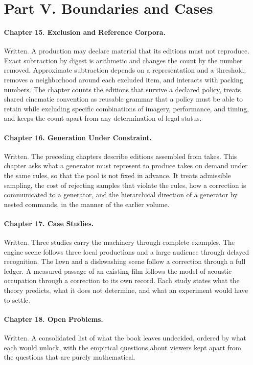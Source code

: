 \documentclass[11pt]{article}
\begin{document}
\section*{Part V. Boundaries and Cases}

\paragraph{Chapter 15. Exclusion and Reference Corpora.} Written. A production may declare material that its editions must not reproduce. Exact subtraction by digest is arithmetic and changes the count by the number removed. Approximate subtraction depends on a representation and a threshold, removes a neighborhood around each excluded item, and interacts with packing numbers. The chapter counts the editions that survive a declared policy, treats shared cinematic convention as reusable grammar that a policy must be able to retain while excluding specific combinations of imagery, performance, and timing, and keeps the count apart from any determination of legal status.

\paragraph{Chapter 16. Generation Under Constraint.} Written. The preceding chapters describe editions assembled from takes. This chapter asks what a generator must represent to produce takes on demand under the same rules, so that the pool is not fixed in advance. It treats admissible sampling, the cost of rejecting samples that violate the rules, how a correction is communicated to a generator, and the hierarchical direction of a generator by nested commands, in the manner of the earlier volume.

\paragraph{Chapter 17. Case Studies.} Written. Three studies carry the machinery through complete examples. The engine scene follows three local productions and a large audience through delayed recognition. The lawn and a dishwashing scene follow a correction through a full ledger. A measured passage of an existing film follows the model of acoustic occupation through a correction to its own record. Each study states what the theory predicts, what it does not determine, and what an experiment would have to settle.

\paragraph{Chapter 18. Open Problems.} Written. A consolidated list of what the book leaves undecided, ordered by what each would unlock, with the empirical questions about viewers kept apart from the questions that are purely mathematical.
\end{document}
